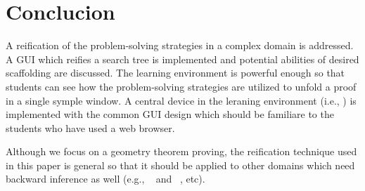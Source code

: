 
\section{Conclucion}

A reification of the problem-solving strategies in a complex domain is
addressed.  A GUI which reifies a search tree is implemented and
potential abilities of desired scaffolding are discussed.  The learning
environment is powerful enough so that students can see how the
problem-solving strategies are utilized to unfold a proof in a single
symple window.  A central device in the leraning environment (i.e.,
\StateView) is implemented with the common GUI design which should be
familiare to the students who have used a web browser.

Although we focus on a geometry theorem proving, the reification
technique used in this paper is general so that it should be applied to
other domains which need backward inference as well (e.g., \ProofTutor\
\cite{Scheines94} and \AlgebraTutor\ \cite{Anderson90}, etc).  

